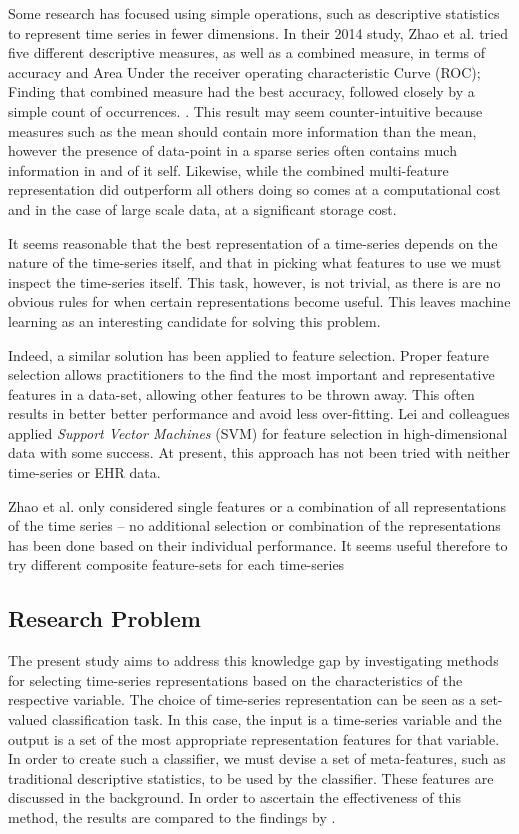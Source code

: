 \documentclass[conference]{IEEEtran}
\begin{document}
Some research has focused using simple operations, such as descriptive statistics to represent time series in fewer dimensions. In their 2014 study, Zhao et al. tried five different descriptive measures, as well as a combined measure, in terms of accuracy and Area Under the receiver operating characteristic Curve (ROC); Finding that combined measure had the best accuracy, followed closely by a simple count of occurrences. \cite{zhao2014}. This result may seem counter-intuitive because measures such as the mean should contain more information than the mean, however the presence of data-point in a sparse series often contains much information in and of it self. Likewise, while the combined multi-feature representation did outperform all others doing so comes at a computational cost and in the case of large scale data, at a significant storage cost.

It seems reasonable that the best representation of a time-series depends on the nature of the time-series itself, and that in picking what features to use we must inspect the time-series itself. This task, however, is not trivial, as there is are no obvious rules for when certain representations become useful. This leaves machine learning as an interesting candidate for solving this problem.

Indeed, a similar solution has been applied to feature selection. Proper feature selection allows practitioners to the find the most important and representative features in a data-set, allowing other features to be thrown away. This often results in better better performance and avoid less over-fitting. Lei and colleagues applied \emph{Support Vector Machines} (SVM) for feature selection in high-dimensional data with some success. \cite{lei2005svm}  At present, this approach has not been tried with neither time-series or EHR data.

Zhao et al. \cite{zhao2014} only considered single features or a combination of all representations of the time series -- no additional selection or combination of the representations has been done based on their individual performance. It seems useful therefore to try different composite feature-sets for each time-series

\subsection{Research Problem}
The present study aims to address this knowledge gap by investigating methods for selecting time-series representations based on the characteristics of the respective variable. The choice of time-series representation can be seen as a set-valued classification task. In this case, the input is a time-series variable and the output is a set of the most appropriate representation features for that variable.
In order to create such a classifier, we must devise a set of meta-features, such as traditional descriptive statistics, to be used by the classifier. These features are discussed in the background. In order to ascertain the effectiveness of this method, the results are compared to the findings by \cite{zhao2014}.
\end{document}
